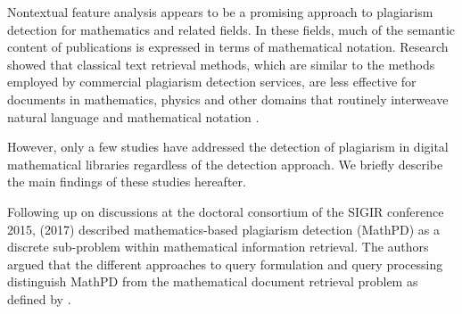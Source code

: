 \documentclass{llncs}
\begin{document}
Nontextual feature analysis appears to be a promising approach to plagiarism detection for mathematics and related fields. In these fields, much of the semantic content of publications is expressed in terms of mathematical notation. Research showed that classical text retrieval methods, which are similar to the methods employed by commercial plagiarism detection services, are less effective for documents in mathematics, physics and other domains that routinely interweave natural language and mathematical notation \cite{Wolska08}.

However, only a few studies have addressed the detection of plagiarism in digital mathematical libraries \cite{Meuschke2017a,Meuschke2018a,Meuschke2019} regardless of the detection approach. We briefly describe the main findings of these studies hereafter.

Following up on discussions at the doctoral consortium of the \mbox{SIGIR} conference 2015,
\citeauthor{Meuschke2017a} (2017) described mathematics-based plagiarism detection (MathPD) as a discrete sub-problem within mathematical information retrieval. The authors argued that the different approaches to query formulation and query processing distinguish MathPD from the mathematical document retrieval problem as defined by \citeauthor{Guidi2016} \cite{Guidi2016}.
\end{document}
